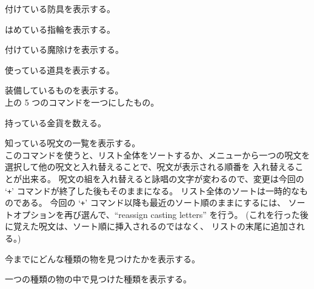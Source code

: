 付けている防具を表示する。
\item[\tb{=}]
はめている指輪を表示する。
\item[\tb{"}]
付けている魔除けを表示する。
\item[\tb{(}]
使っている道具を表示する。
\item[\tb{*}]
装備しているものを表示する。\\
上の 5 つのコマンドを一つにしたもの。
\item[\tb{\$}]
持っている金貨を数える。
\item[\tb{+}]
知っている呪文の一覧を表示する。\\
このコマンドを使うと、リスト全体をソートするか、メニューから一つの呪文を
選択して他の呪文と入れ替えることで、呪文が表示される順番を
入れ替えることが出来る。
呪文の組を入れ替えると詠唱の文字が変わるので、変更は今回の
`{\tt +}' コマンドが終了した後もそのままになる。
リスト全体のソートは一時的なものである。
今回の `{\tt +}' コマンド以降も最近のソート順のままにするには、
ソートオプションを再び選んで、``reassign casting letters'' を行う。
(これを行った後に覚えた呪文は、ソート順に挿入されるのではなく、
リストの末尾に追加される。)
\item[\tb{$\backslash$}]
今までにどんな種類の物を見つけたかを表示する。
\item[\tb{\`}]
一つの種類の物の中で見つけた種類を表示する。
\item[\tb{!}]
